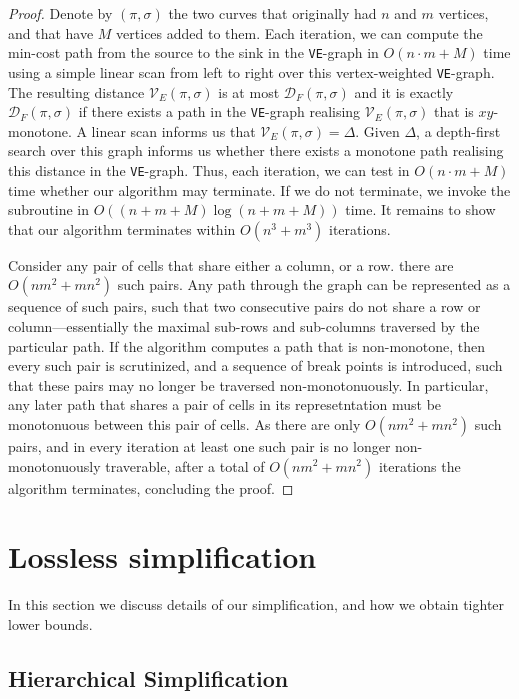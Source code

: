 \documentclass[10pt,a4paper]{article}
\newcommand{\fd}{\mathcal{D}_F}
\newcommand{\ve}{\mathcal{V}_E}
\begin{document}
\shootup*
\begin{proof}
    Denote by $(\pi, \sigma)$ the two curves that originally had $n$ and $m$ vertices, and that have $M$ vertices added to them. 
    Each iteration, we can compute the min-cost path from the source to the sink in the \texttt{VE}-graph in $O(n\cdot m + M)$ time using a simple linear scan from left to right over this vertex-weighted \texttt{VE}-graph.
    The resulting distance $\ve(\pi, \sigma)$ is at most $\fd(\pi, \sigma)$ and it is exactly $\fd(\pi, \sigma)$ if there exists a path in the \texttt{VE}-graph realising $\ve(\pi, \sigma)$ that is $xy$-monotone. 
    A linear scan informs us that $\ve(\pi, \sigma) = \Delta$.
    Given $\Delta$, a depth-first search over this graph informs us whether there exists a monotone path realising this distance in the \texttt{VE}-graph.
    Thus, each iteration, we can test in $O(n\cdot m + M)$ time whether our algorithm may terminate. 
    If we do not terminate, we invoke the subroutine in $O((n+m+M) \log (n+m+M))$ time. 
    It remains to show that our algorithm terminates  within $O(n^3+m^3)$ iterations. 

    Consider any pair of cells that share either a column, or a row. there are $O(nm^2 + mn^2)$ such pairs. Any path through the graph can be represented as a sequence of such pairs, such that two consecutive pairs do not share a row or column---essentially the maximal sub-rows and sub-columns traversed by the particular path. If the algorithm computes a path that is non-monotone, then every such pair is scrutinized, and a sequence of break points is introduced, such that these pairs may no longer be traversed non-monotonuously. In particular, any later path that shares a pair of cells in its represetntation must be monotonuous between this pair of cells. As there are only $O(nm^2 + mn^2)$ such pairs, and in every iteration at least one such pair is no longer non-monotonuously traverable, after a total of $O(nm^2 + mn^2)$ iterations the algorithm terminates, concluding the proof.
\end{proof}




\section{Lossless simplification}
\label{sec:lossless}

In this section we discuss details of our simplification, and how we obtain tighter lower bounds.

\subsection{Hierarchical Simplification}
\end{document}
